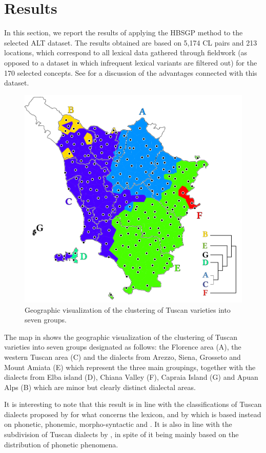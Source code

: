 \documentclass[output=paper]{LSP/langsci}
\begin{document}
\section{Results}
In this section, we report the results of applying the HBSGP method to the selected ALT dataset. The results obtained are based on 5,174 CL pairs and 213 locations, which correspond to all lexical data gathered through fieldwork (as opposed to a dataset in which infrequent lexical variants are filtered out) for the 170 selected concepts. See \citet{wieling_infrequent_2015} for a discussion of the advantages connected with this dataset. 

\begin{figure}[b]
\includegraphics[width=.8\textwidth]{illustrations/monte_wiel_fig1_v2} 
\caption{Geographic visualization of the clustering of Tuscan varieties into seven groups.} 
\label{fig:1}
\end{figure}

The map in  shows the geographic visualization of the clustering of Tuscan varieties into seven groups designated as follows: the Florence area (A), the western Tuscan area (C) and the dialects from Arezzo, Siena, Grosseto and Mount Amiata (E) which represent the three main groupings, together with the dialects from Elba island (D), Chiana Valley (F), Capraia Island (G) and Apuan Alps (B) which are minor but clearly distinct dialectal areas.



It is interesting to note that this result is in line with the classifications of Tuscan dialects proposed by \citet{giacomelli_aree_1975} for what concerns the lexicon, and by \citet{giannelli_toscana_1976} which is based instead on phonetic, phonemic, morpho-syntactic and . It is also in line with the subdivision of Tuscan dialects by \citet{pellegrini_carta_1977}, in spite of it being mainly based on the distribution of phonetic phenomena.
\end{document}

